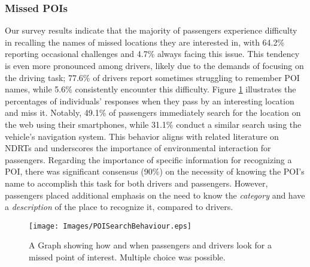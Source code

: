 \subsubsection*{\textbf{Missed POIs}}
Our survey results indicate that the majority of passengers experience difficulty in recalling the names of missed locations they are interested in, with 64.2\% reporting occasional challenges and 4.7\% always facing this issue. This tendency is even more pronounced among drivers, likely due to the demands of focusing on the driving task; 77.6\% of drivers report sometimes struggling to remember POI names, while 5.6\% consistently encounter this difficulty. Figure \ref{fig:survey_search_behaviour} illustrates the percentages of individuals' responses when they pass by an interesting location and miss it. Notably, 49.1\% of passengers immediately search for the location on the web using their smartphones, while 31.1\% conduct a similar search using the vehicle's navigation system. This behavior aligns with related literature on NDRTs \cite{russell2011passengers, hecht2020ndrts, MatsumuraActivePassengering18, BergerGridStudyInCarPassenger2021} and underscores the importance of environmental interaction for passengers. Regarding the importance of specific information for recognizing a POI, there was significant consensus (90\%) on the necessity of knowing the POI's name to accomplish this task for both drivers and passengers. However, passengers placed additional emphasis on the need to know the \textit{category} and have a \textit{description} of the place to recognize it, compared to drivers.

\begin{figure}[ht]
    \centering
    \texttt{[image: Images/POISearchBehaviour.eps]}
    \caption{A Graph showing how and when passengers and drivers look for a missed point of interest. Multiple choice was possible.}
    \label{fig:survey_search_behaviour}
\end{figure}


